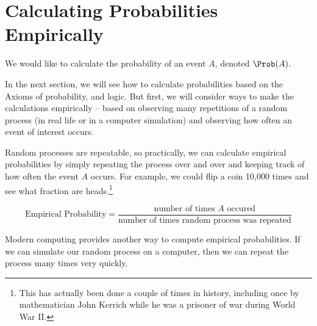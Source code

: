 \documentclass[twoside]{book}\usepackage[]{graphicx}\usepackage[]{xcolor}
\newcounter{example}[section]
\begin{document}
\newpage

\section{Calculating Probabilities Empirically}

We would like to calculate the probability of an event
$A$, denoted $\Prob(A)$.

In the next section, we will see how to calculate probabilities based on the Axioms of probability, and logic.  But first, we will consider ways to make the calculations empirically -- based on observing many repetitions of a random process (in real life or in a computer simulation) and observing how often an event of interest occurs.

Random processes are repeatable, so practically, we can calculate empirical probabilities by simply repeating the process
over and over and keeping track of how often the event $A$ occurs.
For example, we could flip a coin 10,000 times and see what fraction 
are heads.\footnote{This has actually been done a couple of times 
in history, including once by mathematician John Kerrich while he was a prisoner of war during World War II.}

\[
\mbox{Empirical Probability} = 
\frac{\mbox{number of times $A$ occured}}
{\mbox{number of times random process was repeated}}
\]

Modern computing provides another way to compute empirical probabilities.
If we can simulate our random process on a computer, then we can 
repeat the process many times very quickly.  
\end{document}
